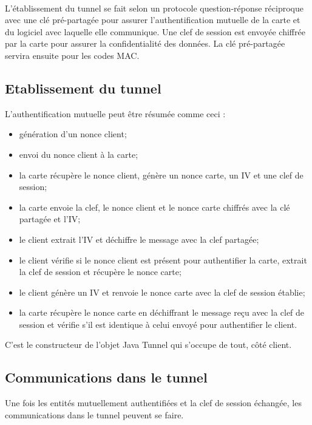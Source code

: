 \documentclass[a4paper,11pt,french]{article}
\begin{document}
\paragraph{}
L'établissement du tunnel se fait selon un protocole question-réponse 
réciproque avec une clé pré-partagée  pour assurer l'authentification mutuelle de la carte et du logiciel 
avec laquelle elle communique. Une clef de session est envoyée chiffrée par la 
carte pour assurer la confidentialité des données. La clé pré-partagée servira ensuite pour les codes MAC.

\subsection{Etablissement du tunnel}
L'authentification mutuelle peut être résumée comme ceci : 
\begin{itemize}
    \item génération d'un nonce client;
    \item envoi du nonce client à la carte;
    \item la carte récupère le nonce client, génère un nonce carte, un IV et une clef
        de session;
    \item la carte envoie la clef, le nonce client et le nonce carte chiffrés avec la
        clé partagée et l'IV;
    \item le client extrait l'IV et déchiffre le message avec la clef partagée;
    \item le client vérifie si le nonce client est présent pour authentifier la 
        carte, extrait la clef de session et récupère le nonce carte;
    \item le client génère un IV et renvoie le nonce carte avec la clef de session 
        établie;
    \item la carte récupère le nonce carte en déchiffrant le message reçu avec 
        la clef de session et vérifie s'il est identique à celui envoyé pour 
        authentifier le client.
\end{itemize}

C'est le constructeur de l'objet Java \og{}Tunnel \fg{} qui s'occupe de tout,
côté client.

\subsection{Communications dans le tunnel}
Une fois les entités mutuellement authentifiées et la clef de session échangée, 
les communications dans le tunnel peuvent se faire. 
\end{document}
